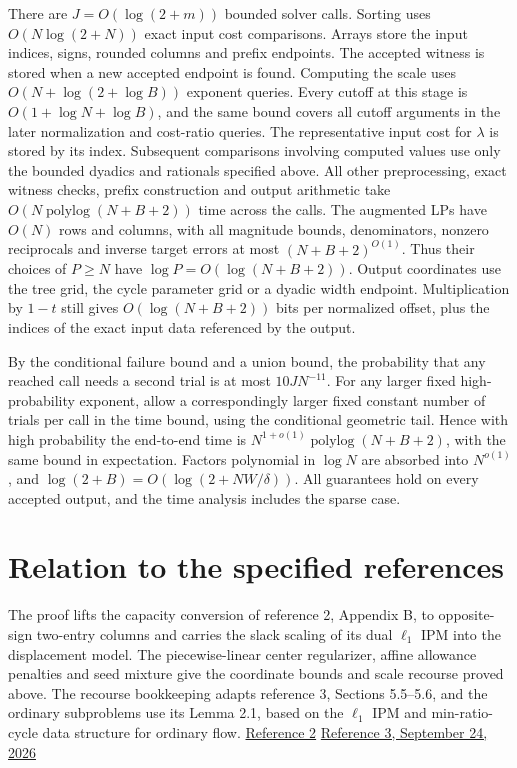 \documentclass[11pt]{article}
\begin{document}
There are \(J=O(\log(2+m))\) bounded solver calls. Sorting uses \(O(N\log(2+N))\) exact input cost comparisons. Arrays store the input indices, signs, rounded columns and prefix endpoints. The accepted witness is stored when a new accepted endpoint is found. Computing the scale uses \(O(N+\log(2+\log B))\) exponent queries. Every cutoff at this stage is \(O(1+\log N+\log B)\), and the same bound covers all cutoff arguments in the later normalization and cost-ratio queries. The representative input cost for \(\lambda\) is stored by its index. Subsequent comparisons involving computed values use only the bounded dyadics and rationals specified above. All other preprocessing, exact witness checks, prefix construction and output arithmetic take \(O(N\operatorname{polylog}(N+B+2))\) time across the calls. The augmented LPs have \(O(N)\) rows and columns, with all magnitude bounds, denominators, nonzero reciprocals and inverse target errors at most \((N+B+2)^{O(1)}\). Thus their choices of \(P\ge N\) have \(\log P=O(\log(N+B+2))\). Output coordinates use the tree grid, the cycle parameter grid or a dyadic width endpoint. Multiplication by \(1-t\) still gives \(O(\log(N+B+2))\) bits per normalized offset, plus the indices of the exact input data referenced by the output.

By the conditional failure bound and a union bound, the probability that any reached call needs a second trial is at most \(10J N^{-11}\). For any larger fixed high-probability exponent, allow a correspondingly larger fixed constant number of trials per call in the time bound, using the conditional geometric tail. Hence with high probability the end-to-end time is \(N^{1+o(1)}\operatorname{polylog}(N+B+2)\), with the same bound in expectation. Factors polynomial in \(\log N\) are absorbed into \(N^{o(1)}\), and \(\log(2+B)=O(\log(2+NW/\delta))\). All guarantees hold on every accepted output, and the time analysis includes the sparse case.

\hypertarget{relation-to-the-specified-references}{%
\section*{Relation to the specified references}\label{relation-to-the-specified-references}}

The proof lifts the capacity conversion of reference 2, Appendix B, to opposite-sign two-entry columns and carries the slack scaling of its dual \(\ell_1\) IPM into the displacement model. The piecewise-linear center regularizer, affine allowance penalties and seed mixture give the coordinate bounds and scale recourse proved above. The recourse bookkeeping adapts reference 3, Sections 5.5--5.6, and the ordinary subproblems use its Lemma 2.1, based on the \(\ell_1\) IPM and min-ratio-cycle data structure for ordinary flow. \href{https://arxiv.org/pdf/2407.10830v1}{Reference 2} \href{https://github.com/openai/math/blob/main/preprints/Almost-Linear-Time-Maximum-Cardinality-Matching-in-Sparse-General-Graphs-September-24-2026/main.pdf}{Reference 3, September 24, 2026}
\end{document}
